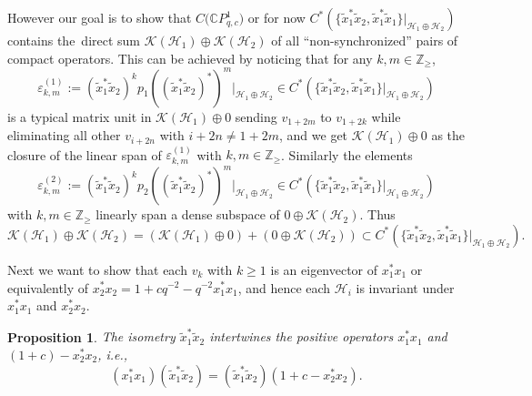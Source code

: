 \documentclass[11pt]{article}
\numberwithin{equation}{section}
\newtheorem{proposition}{Proposition}
\begin{document}
However our goal is to show that $C\big(\mathbb{C}P_{q,c}^{1}\big) $ or
for now $C^{\ast} ( \{ \tilde{x}_{1}^{\ast}\tilde{x}_{2},\tilde
{x}_{1}^{\ast}\tilde{x}_{1} \} |_{\mathcal{H}_{1}\oplus\mathcal{H}_{2}
} ) $ contains the\ direct sum $\mathcal{K} ( \mathcal{H}
_{1} ) \oplus\mathcal{K}( \mathcal{H}_{2} ) $ of all
``non-synchronized'' pairs of compact
operators. This can be achieved by noticing that for any $k,m\in
\mathbb{Z}_{\geq}$,
\[
\varepsilon_{k,m}^{( 1) }:=( \tilde{x}_{1}^{\ast}\tilde
{x}_{2}) ^{k}p_{1}( ( \tilde{x}_{1}^{\ast}\tilde{x}%
_{2}) ^{\ast}) ^{m}|_{\mathcal{H}_{1}\oplus\mathcal{H}_{2}}\in
C^{\ast}( \{ \tilde{x}_{1}^{\ast}\tilde{x}_{2},\tilde{x}_{1}%
^{\ast}\tilde{x}_{1}\} |_{\mathcal{H}_{1}\oplus\mathcal{H}_{2}})
\]
is a typical matrix unit in $\mathcal{K}( \mathcal{H}_{1})
\oplus0$ sending $v_{1+2m}$ to $v_{1+2k}$ while eliminating all other
$v_{i+2n}$ with $i+2n\neq1+2m$, and we get $\mathcal{K}( \mathcal{H}%
_{1}) \oplus0$ as the closure of the linear span of $\varepsilon
_{k,m}^{( 1) }$ with $k,m\in\mathbb{Z}_{\geq}$. Similarly the
elements
\[
\varepsilon_{k,m}^{(2) }:=( \tilde{x}_{1}^{\ast}\tilde
{x}_{2}) ^{k}p_{2}( ( \tilde{x}_{1}^{\ast}\tilde{x}%
_{2}) ^{\ast}) ^{m}|_{\mathcal{H}_{1}\oplus\mathcal{H}_{2}}\in
C^{\ast}( \{ \tilde{x}_{1}^{\ast}\tilde{x}_{2},\tilde{x}_{1}%
^{\ast}\tilde{x}_{1}\} |_{\mathcal{H}_{1}\oplus\mathcal{H}_{2}})
\]
with $k,m\in\mathbb{Z}_{\geq}$ linearly span a dense subspace of
$0\oplus\mathcal{K}( \mathcal{H}_{2}) $. Thus
\[
\mathcal{K}( \mathcal{H}_{1}) \oplus\mathcal{K}(
\mathcal{H}_{2}) =( \mathcal{K}( \mathcal{H}_{1})
\oplus0) +( 0\oplus\mathcal{K}( \mathcal{H}_{2})
) \subset C^{\ast}( \{ \tilde{x}_{1}^{\ast}\tilde{x}%
_{2},\tilde{x}_{1}^{\ast}\tilde{x}_{1}\} |_{\mathcal{H}_{1}%
\oplus\mathcal{H}_{2}}) .
\]


Next we want to show that each $v_{k}$ with $k\geq1$ is an eigenvector of
$x_{1}^{\ast}x_{1}$ or equivalently of $x_{2}^{\ast}x_{2}=1+cq^{-2}%
-q^{-2}x_{1}^{\ast}x_{1}$, and hence each $\mathcal{H}_{i}$ is invariant under
$x_{1}^{\ast}x_{1}$ and $x_{2}^{\ast}x_{2}$.

\begin{proposition}\label{intertwine} The isometry $\tilde{x}_{1}^{\ast}\tilde{x}_{2}$
intertwines the positive operators $x_{1}^{\ast}x_{1}$ and $(
1+c) -x_{2}^{\ast}x_{2}$, i.e.,
\[
( x_{1}^{\ast}x_{1}) ( \tilde{x}_{1}^{\ast}\tilde{x}%
_{2}) =( \tilde{x}_{1}^{\ast}\tilde{x}_{2}) (
1+c-x_{2}^{\ast}x_{2}) .
\]
\end{proposition}
\end{document}
